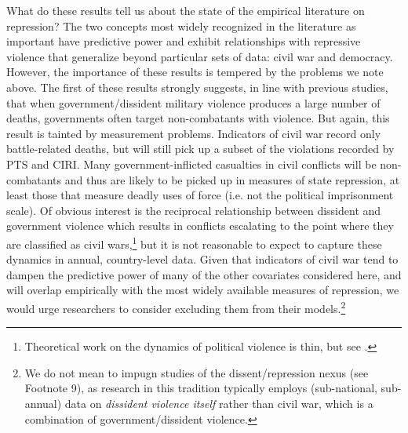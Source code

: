 \documentclass[11pt]{article}
\begin{document}
What do these results tell us about the state of the empirical literature on repression? The two concepts most widely recognized in the literature as important have predictive power and exhibit relationships with repressive violence that generalize beyond particular sets of data: civil war and democracy. However, the importance of these results is tempered by the problems we note above. The first of these results strongly suggests, in line with previous studies, that when government/dissident military violence produces a large number of deaths, governments often target non-combatants with violence. But again, this result is tainted by measurement problems. Indicators of civil war record only battle-related deaths, but will still pick up a subset of the violations recorded by PTS and CIRI. Many government-inflicted casualties in civil conflicts will be non-combatants and thus are likely to be picked up in measures of state repression, at least those that measure deadly uses of force (i.e. not the political imprisonment scale). Of obvious interest is the reciprocal relationship between dissident and government violence which results in conflicts escalating to the point where they are classified as civil wars,\footnote{Theoretical work on the dynamics of political violence is thin, but see \citet{Lichbach1987,Moore2000,Pierskalla2010,RitterJCR}.} but it is not reasonable to expect to capture these dynamics in annual, country-level data. Given that indicators of civil war tend to dampen the predictive power of many of the other covariates considered here, and will overlap empirically with the most widely available measures of repression, we would urge researchers to consider excluding them from their models.\footnote{We do not mean to impugn studies of the dissent/repression nexus (see Footnote 9), as research in this tradition typically employs (sub-national, sub-annual) data on {\em dissident violence itself} rather than civil war, which is a combination of government/dissident violence.}  
\end{document}

